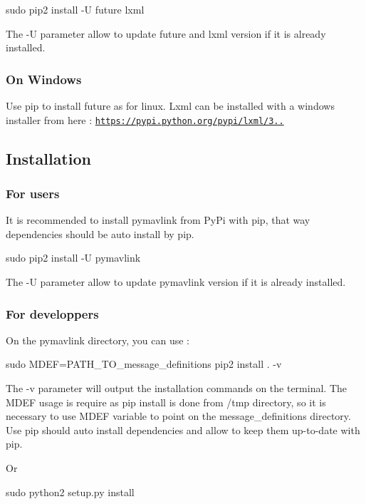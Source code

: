\begin{DoxyCode}
sudo pip2 install -U future lxml
\end{DoxyCode}


The -\/U parameter allow to update future and lxml version if it is already installed.

\subsubsection*{On Windows}

Use pip to install future as for linux. Lxml can be installed with a windows installer from here \+: \href{https://pypi.python.org/pypi/lxml/3.6.0}{\tt https\+://pypi.\+python.\+org/pypi/lxml/3..}

\subsection*{Installation}

\subsubsection*{For users}

It is recommended to install pymavlink from Py\+Pi with pip, that way dependencies should be auto install by pip. 
\begin{DoxyCode}
sudo pip2 install -U pymavlink
\end{DoxyCode}
 The -\/U parameter allow to update pymavlink version if it is already installed.

\subsubsection*{For developpers}

On the pymavlink directory, you can use \+: 
\begin{DoxyCode}
sudo MDEF=PATH\_TO\_message\_definitions pip2 install . -v
\end{DoxyCode}
 The -\/v parameter will output the installation commands on the terminal. The M\+D\+EF usage is require as pip install is done from /tmp directory, so it is necessary to use M\+D\+EF variable to point on the message\+\_\+definitions directory. Use pip should auto install dependencies and allow to keep them up-\/to-\/date with pip.

Or 
\begin{DoxyCode}
sudo python2 setup.py install
\end{DoxyCode}


